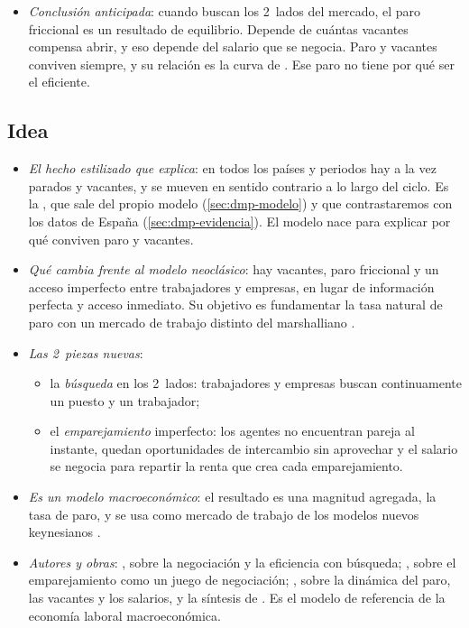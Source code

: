 \documentclass[11pt]{article}
\begin{document}
\begin{itemize}
\item \emph{Conclusión anticipada}: cuando buscan los 2~lados del mercado, el paro friccional es un resultado de equilibrio. Depende de cuántas vacantes compensa abrir, y eso depende del salario que se negocia. Paro y vacantes conviven siempre, y su relación es la curva de . Ese paro no tiene por qué ser el eficiente.
\end{itemize}

\subsection{Idea}\label{sec:dmp-idea}

\begin{itemize}
\item \emph{El hecho estilizado que explica}: en todos los países y periodos hay a la vez parados y vacantes, y se mueven en sentido contrario a lo largo del ciclo. Es la \nocite{ElsbyMichaelsRatner2015Beveridge}, que sale del propio modelo (\ref{sec:dmp-modelo}) y que contrastaremos con los datos de España (\ref{sec:dmp-evidencia}). El modelo nace para explicar por qué conviven paro y vacantes.
\item \emph{Qué cambia frente al modelo neoclásico}: hay vacantes, paro friccional y un acceso imperfecto entre trabajadores y empresas, en lugar de información perfecta y acceso inmediato. Su objetivo es fundamentar la tasa natural de paro con un mercado de trabajo distinto del marshalliano .
\item \emph{Las 2~piezas nuevas}:
  \begin{itemize}
  \item la \emph{búsqueda} en los 2~lados: trabajadores y empresas buscan continuamente un puesto y un trabajador;
  \item el \emph{emparejamiento} imperfecto: los agentes no encuentran pareja al instante, quedan oportunidades de intercambio sin aprovechar y el salario se negocia para repartir la renta que crea cada emparejamiento.
  \end{itemize}
\item \emph{Es un modelo macroeconómico}: el resultado es una magnitud agregada, la tasa de paro, y se usa como mercado de trabajo de los modelos nuevos keynesianos .
\item \emph{Autores y obras}: \textcite{Diamond1982Wage}, sobre la negociación y la eficiencia con búsqueda; \textcite{Mortensen1982Matching}, sobre el emparejamiento como un juego de negociación; \textcite{Pissarides1985Short}, sobre la dinámica del paro, las vacantes y los salarios, y la síntesis de \textcite{Pissarides2000Equilibrium}. Es el modelo de referencia de la economía laboral macroeconómica\nocite{RogersonShimerWright2005Search}.
\end{itemize}
\end{document}

